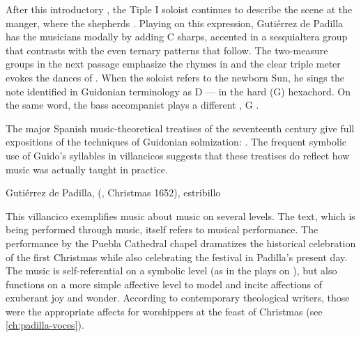 After this introductory , the Tiple I soloist continues to
describe the scene at the manger, where the shepherds .
Playing on this expression, Gutiérrez de Padilla has the musicians
 modally by adding C sharps, accented in a sesquialtera group that
contrasts with the even ternary patterns that follow.
The two-measure groups in the next passage emphasize the rhymes in
 and the clear triple meter evokes the
dances of .
When the soloist refers to the newborn Sun, he sings the note identified in
Guidonian terminology as D --- in the hard (G)
hexachord.  
On the same word, the bass accompanist plays a different , G
.%
\begin{Footnote}
    The major Spanish music-theoretical treatises of the seventeenth century
    give full expositions of the techniques of Guidonian solmization:
    \autocites{Cerone:Melopeo}{Lorente:Porque}.
    The frequent symbolic use of Guido's syllables in villancicos suggests that
    these treatises do reflect how music was actually taught in practice.
\end{Footnote}

{Gutiérrez de Padilla, 
(, Christmas 1652), estribillo}

This villancico exemplifies music about music on several levels.
The text, which is being performed through music, itself refers to musical
performance.
The performance by the Puebla Cathedral chapel dramatizes the historical
celebration of the first Christmas while also celebrating the festival in
Padilla's present day.  
The music is self-referential on a symbolic level (as in the plays on
), but also functions on a more simple affective level to model and
incite affections of exuberant joy and wonder.
According to contemporary theological writers, those were the appropriate
affects for worshippers at the feast of Christmas (see
\cref{ch:padilla-voces}).


